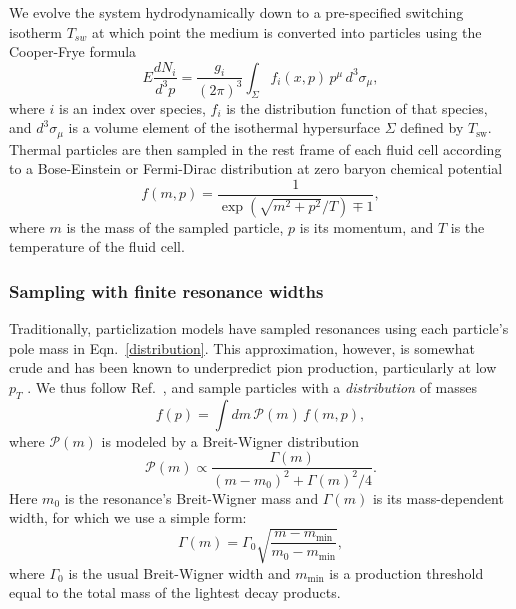 \documentclass[aps,prc,reprint,amsmath,nofootinbib]{revtex4-1}
\begin{document}
We evolve the system hydrodynamically down to a pre-specified switching isotherm $T_{sw}$ at which point the medium is converted into particles using the Cooper-Frye formula \cite{PhysRevD.10.186}
\begin{equation}
  \label{cooper-frye}
  E \frac{dN_i}{d^3p} = \frac{g_i}{(2\pi)^3} \int_\Sigma f_i(x, p)\, p^\mu\, d^3\sigma_\mu,
\end{equation}
where $i$ is an index over species, $f_i$ is the distribution function of that species, and $d^3\sigma_\mu$ is a volume element of the isothermal hypersurface $\Sigma$ defined by $T_\mathrm{sw}$.
Thermal particles are then sampled in the rest frame of each fluid cell according to a Bose-Einstein or Fermi-Dirac distribution at zero baryon chemical potential
\begin{equation}
  \label{distribution}
  f(m, p) = \frac{1}{\exp(\sqrt{m^2 + p^2}/T) \mp 1},
\end{equation}
where $m$ is the mass of the sampled particle, $p$ is its momentum, and $T$ is the temperature of the fluid cell.

\subsubsection{Sampling with finite resonance widths}

Traditionally, particlization models have sampled resonances using each particle's pole mass in Eqn.~\eqref{distribution}.
This approximation, however, is somewhat crude and has been known to underpredict pion production, particularly at low $p_T$ \cite{Sollfrank:1991xm, Huovinen:2016xxq, Vovchenko:2018fmh}.
We thus follow Ref.~\cite{Bernhard:2018hnz}, and sample particles with a \emph{distribution} of masses
\begin{equation}
  f(p) = \int dm\, \mathcal{P}(m)\, f(m, p),
\end{equation}
where $\mathcal{P}(m)$ is modeled by a Breit-Wigner distribution
\begin{equation}
  \mathcal{P}(m) \propto \frac{\Gamma(m)}{(m - m_0)^2 + \Gamma(m)^2/4}.
\end{equation}
Here $m_0$ is the resonance's Breit-Wigner mass and $\Gamma(m)$ is its mass-dependent width, for which we use a simple form:
\begin{equation}
  \Gamma(m) = \Gamma_0 \sqrt{\frac{m - m_\mathrm{min}}{m_0 - m_\mathrm{min}}},
\end{equation}
where $\Gamma_0$ is the usual Breit-Wigner width and $m_\mathrm{min}$ is a production threshold equal to the total mass of the lightest decay products.
\end{document}
